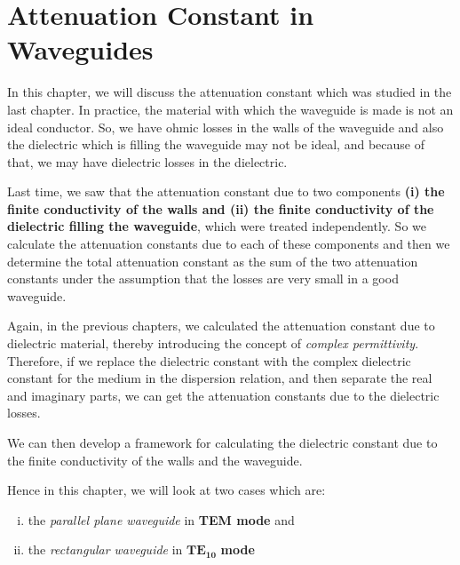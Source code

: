 \chapter{Attenuation Constant in Waveguides}
In this chapter, we will discuss the attenuation constant which was studied in the last chapter. In practice, the material with which the waveguide is made is not an ideal conductor. So, we have ohmic losses in the walls of the waveguide and also the dielectric which is filling the waveguide may not be ideal, and because of that, we may have dielectric losses in the dielectric.

Last time, we saw that the attenuation constant due to two components \textbf{(i) the finite conductivity of the walls and (ii) the finite conductivity of the dielectric filling the waveguide}, which were treated independently. So we calculate the attenuation constants due to each of these components and then we determine the total attenuation constant as the sum of the two attenuation constants under the assumption that the losses are very small in a good waveguide.

Again, in the previous chapters, we calculated the attenuation constant due to dielectric material, thereby introducing the concept of \emph{complex permittivity}. Therefore, if we replace the dielectric constant with the complex dielectric constant for the medium in the dispersion relation, and then separate the real and imaginary parts, we can get the attenuation constants due to the dielectric losses.

We can then develop a framework for calculating the dielectric constant due to the finite conductivity of the walls and the waveguide.

Hence in this chapter, we will look at two cases which are:
\begin{enumerate}[(i)]
\item the \emph{parallel plane waveguide} in \textbf{TEM mode} and
\item the \emph{rectangular waveguide} in $\boldsymbol{TE_{10}}$ \textbf{mode}
\end{enumerate}

